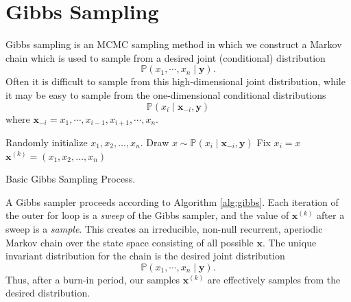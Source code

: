 
\section*{Gibbs Sampling}
Gibbs sampling is an MCMC sampling method in which we construct a Markov chain which is used to sample from a desired joint (conditional) distribution
\begin{equation*}
\mathbb{P}(x_{1},\cdots,x_{n} \mid \mathbf{y}).
\end{equation*}
Often it is difficult to sample from this high-dimensional joint distribution, while it may be easy to sample from the one-dimensional
conditional distributions
\begin{equation*}
\mathbb{P}(x_{i} \mid \mathbf{x}_{-i}, \mathbf{y})
\end{equation*}
where $\mathbf{x}_{-i} = x_{1},\cdots,x_{i-1},x_{i+1},\cdots,x_{n}.$

\begin{algorithm}
\begin{algorithmic}[1]
    \State \textrm{Randomly initialize } $x_1,x_2,\ldots,x_n$.
            \State \textrm{Draw } $x \sim \mathbb{P}(x_{i} \mid \mathbf{x}_{-i}, \mathbf{y})$
            \State \textrm{Fix } $x_i = x$
        \EndFor
        \State $\mathbf{x}^{(k)}= (x_1,x_2,\ldots,x_n)$
    \EndFor
\EndProcedure
\end{algorithmic}
\caption{Basic Gibbs Sampling Process.}
\label{alg:gibbs}
\end{algorithm}
A Gibbs sampler proceeds according to Algorithm \ref{alg:gibbs}.
Each iteration of the outer for loop is a \emph{sweep} of the Gibbs sampler, and the value of $\mathbf{x}^{(k)}$ after a sweep is a \emph{sample}.
This creates an irreducible, non-null recurrent, aperiodic Markov chain over the state space consisting of all possible $\mathbf{x}$.
The unique invariant distribution for the chain is the desired joint distribution
\begin{equation*}
\mathbb{P}(x_{1},\cdots,x_{n} \mid \mathbf{y}).
\end{equation*}
Thus, after a burn-in period, our samples $\mathbf{x}^{(k)}$ are effectively samples from the desired distribution.

